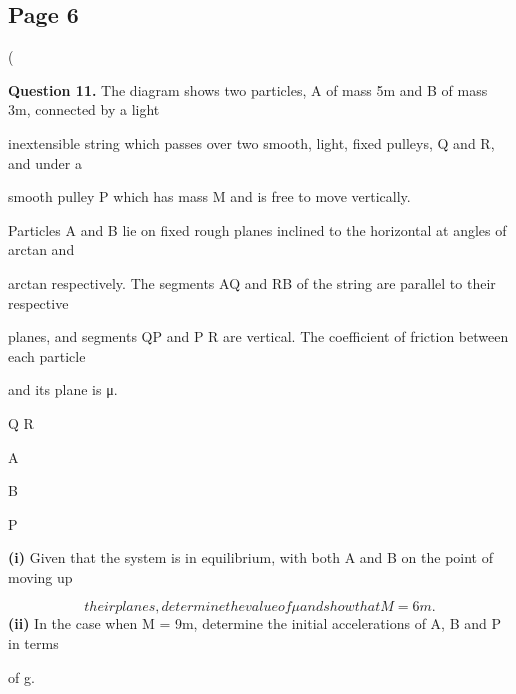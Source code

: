 \documentclass[12pt]{article}
\begin{document}
\subsection*{Page 6}
\begin{flushleft}
(\par
\bigskip\textbf{Question 11.} The diagram shows two particles, A of mass 5m and B of mass 3m, connected by a light\par
inextensible string which passes over two smooth, light, fixed pulleys, Q and R, and under a\par
smooth pulley P which has mass M and is free to move vertically.\par
Particles A and B lie on fixed rough planes inclined to the horizontal at angles of arctan and\par
arctan respectively. The segments AQ and RB of the string are parallel to their respective\par
planes, and segments QP and P R are vertical. The coefficient of friction between each particle\par
and its plane is μ.\par
Q R\par
A\par
B\par
P\par
\textbf{(i)} Given that the system is in equilibrium, with both A and B on the point of moving up\par
\[their planes, determine the value of μ and show that M = 6m.\]
\textbf{(ii)} In the case when M = 9m, determine the initial accelerations of A, B and P in terms\par
of g.\par
\end{flushleft}
\end{document}
